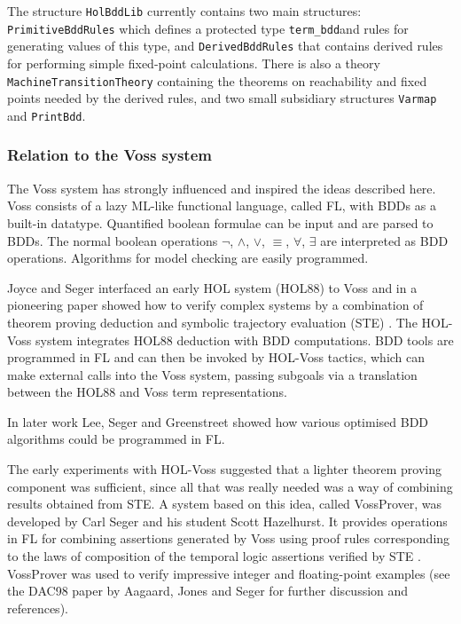 \documentclass[12pt,fleqn]{book}
\renewcommand{\t}[1]{\mbox{\tt #1}}
\newcommand\termbddty{\texttt{term\_bdd}{}}
\begin{document}
The structure \t{HolBddLib} currently contains two main structures: \t{PrimitiveBddRules}
which defines a protected type \termbddty and rules for generating
values of this type, and \t{DerivedBddRules} that contains derived
rules for performing simple fixed-point calculations.  There is also a
theory \t{MachineTransitionTheory} containing the theorems on
reachability and fixed points needed by the derived rules,
and two small subsidiary structures \t{Varmap} and \t{PrintBdd}.


\subsubsection{Relation to the Voss system}\label{related}

The Voss system \cite{SegerVoss} has strongly influenced and inspired
the ideas described here. Voss consists of a lazy
ML-like functional language, called FL, with BDDs as a built-in datatype.
Quantified boolean formulae can be input and are parsed to BDDs.
The normal boolean operations $\neg$, $\wedge$, $\vee$, $\equiv$,
$\forall$, $\exists$ are interpreted as BDD operations.  
Algorithms for model checking are easily programmed.

Joyce and Seger interfaced an early HOL system (HOL88) to Voss and in
a pioneering paper showed how to verify complex systems by a
combination of theorem proving deduction and symbolic trajectory
evaluation (STE) \cite{JoyceSeger}. The HOL-Voss system integrates HOL88
deduction with BDD computations.  BDD tools are programmed in FL and
can then be invoked by HOL-Voss tactics, which can make external
calls into the Voss system, passing subgoals via a translation between
the HOL88 and Voss term representations.

In later work Lee, Seger and Greenstreet \cite{LeeGreenstreetSeger}
showed how various optimised BDD algorithms could be programmed in FL.

The early experiments with HOL-Voss suggested that a lighter theorem
proving component was sufficient, since all that was really needed was
a way of combining results obtained from STE. A system based on this
idea, called VossProver, was developed by Carl Seger and his student
Scott Hazelhurst. It provides operations in FL for combining
assertions generated by Voss using proof rules corresponding to the
laws of composition of the temporal logic assertions verified by STE
\cite{hazelhurst-kropfbook-97}.  
VossProver was used to verify
impressive integer and floating-point examples (see the DAC98
paper by Aagaard, Jones and Seger \cite{aagaard-dac-98} for further
discussion and references). 
\end{document}
